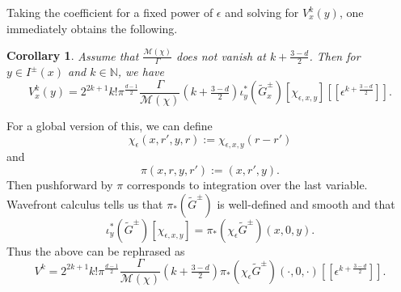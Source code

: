 \documentclass[11pt]{article}
\def\N{{\mathbb{N}}}
\def\M{\mathcal{M}}
\newtheorem{cor}[df]{Corollary}
\begin{document}
Taking the coefficient for a fixed power of $\epsilon$ and solving for $V^k_x(y)$, one immediately obtains the following.
\begin{cor}
\label{offdV}
	Assume that $\frac{\M(\chi)}{\Gamma}$ does not vanish at $k+\tfrac{3-d}{2}$.
	Then for $y\in I^\pm(x)$ and $k\in \N$, we have
	\[V^k_x(y)=2^{2k+1}k!\pi^{\tfrac{d-1}{2}}\frac{\Gamma}{\M(\chi)}(k+\tfrac{3-d}{2})\iota_y^*(\tilde G^\pm_x)[\chi_{\epsilon,x,y}][[\epsilon^{k+\tfrac{3-d}{2}}]].\]
\end{cor}
For a global version of this, we can define
\[\chi_\epsilon(x,r',y,r):=\chi_{\epsilon,x,y}(r-r')\]
and
\[\pi(x,r,y,r'):=(x,r',y).\]
Then pushforward by $\pi$ corresponds to integration over the last variable. Wavefront calculus tells us that $\pi_*(\tilde G^\pm)$ is well-defined and smooth and that
\[\iota_y^*(\tilde G^\pm)[\chi_{\epsilon,x,y}]=\pi_*(\chi_\epsilon\tilde G^\pm)(x,0,y).\]
Thus the above can be rephrased as
\[V^k=2^{2k+1}k!\pi^{\tfrac{d-1}{2}}\frac{\Gamma}{\M(\chi)}(k+\tfrac{3-d}{2})\pi_*(\chi_\epsilon\tilde G^\pm)(\cdot,0,\cdot)[[\epsilon^{k+\tfrac{3-d}{2}}]].\]

\printbibliography
\end{document}
